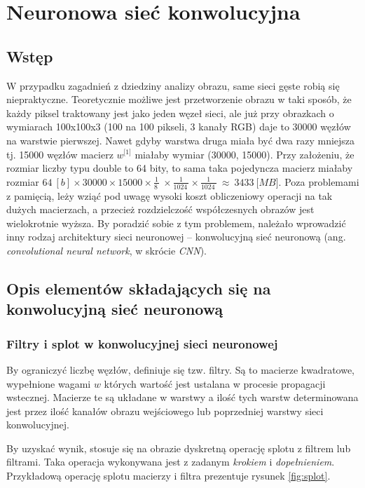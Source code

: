 \chapter{Neuronowa sieć konwolucyjna}
\label{chap:cnn}
\section{Wstęp}
\label{cnn-wstęp}
W przypadku zagadnień z dziedziny analizy obrazu, same sieci gęste robią się niepraktyczne. Teoretycznie możliwe jest przetworzenie obrazu w taki sposób, że każdy piksel traktowany jest jako jeden węzeł sieci,
ale już przy obrazkach o wymiarach 100x100x3 (100 na 100 pikseli, 3 kanały RGB) daje to 30000 węzłów na warstwie pierwszej. Nawet gdyby warstwa druga
miała być dwa razy mniejsza tj. 15000 węzłów macierz \(w^{\lbrack 1\rbrack}\) miałaby wymiar (30000, 15000). 
Przy założeniu, że rozmiar liczby typu double to 64 bity, to sama taka pojedyncza macierz miałaby rozmiar \(64\ \left\lbrack b \right\rbrack \times 30000 \times 15000 \times \frac{1}{8\ }\ \times \frac{1}{1024\ } \times \frac{1}{1024\ }\  \approx \ 3433\ \lbrack MB\rbrack\). Poza problemami z pamięcią,
leży wziąć pod uwagę wysoki koszt obliczeniowy operacji na tak dużych macierzach, a przecież rozdzielczość współczesnych obrazów jest wielokrotnie wyższa. By poradzić sobie z tym problemem, należało wprowadzić inny rodzaj architektury sieci neuronowej -- konwolucyjną sieć neuronową (ang. \textit{convolutional neural network}, w skrócie \textit{CNN}).

\section{Opis elementów składających się na konwolucyjną sieć neuronową}
\label{opis-elementów-cnn}

\subsection{Filtry i splot w konwolucyjnej sieci neuronowej}

By ograniczyć liczbę węzłów, definiuje się tzw. filtry. Są to macierze kwadratowe, wypełnione wagami \(w\) których wartość jest ustalana w procesie propagacji wstecznej. Macierze te są układane w warstwy a ilość tych warstw determinowana jest przez ilość kanałów obrazu wejściowego lub poprzedniej warstwy sieci konwolucyjnej.

By uzyskać wynik, stosuje się na obrazie dyskretną operację splotu z filtrem lub filtrami. Taka operacja wykonywana jest z zadanym \emph{krokiem} i \emph{dopełnieniem}. Przykładową operację splotu macierzy i filtra prezentuje rysunek \ref{fig:splot}.

